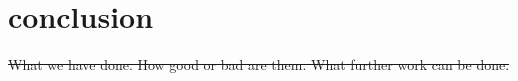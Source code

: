 \chapter{conclusion}
\sout{What we have done. How good or bad are them. What further work can be done.}
